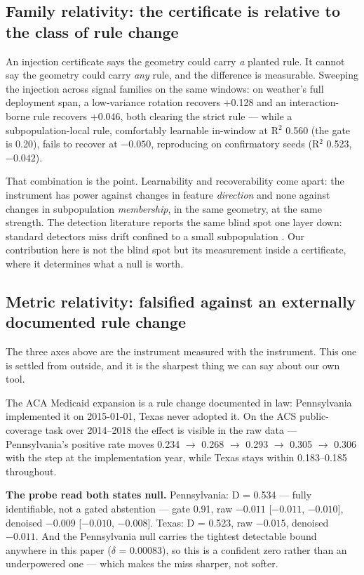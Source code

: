 \documentclass[10pt]{article} %
\begin{document}
\subsection{Family relativity: the certificate is relative to the class of rule change}\label{sec:familyrel}

An injection certificate says the geometry could carry \emph{a} planted rule. It cannot say the
geometry could carry \emph{any} rule, and the difference is measurable. Sweeping the injection across
signal families on the same windows: on weather's full deployment span, a low-variance rotation
recovers +0.128 and an interaction-borne rule recovers +0.046, both clearing the strict
rule --- while a subpopulation-local rule, comfortably learnable in-window at R$^2$ 0.560 (the
gate is 0.20), fails to recover at $-0.050$, reproducing on confirmatory seeds (R$^2$ 0.523,
$-0.042$).

That combination is the point. Learnability and recoverability come apart: the instrument has
power against changes in feature \emph{direction} and none against changes in subpopulation
\emph{membership}, in the same geometry, at the same strength. The detection literature reports
the same blind spot one layer down: standard detectors miss drift confined to a small
subpopulation \citep{giobergia2024localized}. Our contribution here is not the blind spot but its
measurement inside a certificate, where it determines what a null is worth.

\subsection{Metric relativity: falsified against an externally documented rule change}\label{sec:metricrel}

The three axes above are the instrument measured with the instrument. This one is settled from
outside, and it is the sharpest thing we can say about our own tool.

The ACA Medicaid expansion is a rule change documented in law: Pennsylvania implemented it on
2015-01-01, Texas never adopted it. On the ACS public-coverage task over 2014--2018 the effect is
visible in the raw data --- Pennsylvania's positive rate moves 0.234 $\to$ 0.268 $\to$ 0.293 $\to$ 0.305 $\to$
0.306 with the step at the implementation year, while Texas stays within 0.183--0.185 throughout.

\textbf{The probe read both states null.} Pennsylvania: D = 0.534 --- fully identifiable, not a gated
abstention --- gate 0.91, raw $-0.011$ [$-0.011$, $-0.010$], denoised $-0.009$ [$-0.010$, $-0.008$]. Texas:
D = 0.523, raw $-0.015$, denoised $-0.011$. And the Pennsylvania null carries the tightest
detectable bound anywhere in this paper ($\delta$ = 0.00083), so this is a confident zero rather than an
underpowered one --- which makes the miss sharper, not softer.
\end{document}
